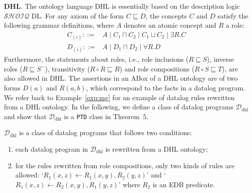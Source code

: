 \documentclass{article}
\begin{document}
\textbf{DHL}. The ontology language DHL \cite{DBLP:conf/www/GrosofHVD03} is essentially based on the description logic $\mathcal{SHOIQ}$
DL. 
For any axiom of the form $C\sqsubseteq D$, the concepts $C$ and $D$ satisfy the following grammar definitions, where $A$ denotes an atomic concept and $R$ a role:
%
  \begin{align*}
    C_{(i)} ::= & A \mid C_1 \sqcap C_2 \mid C_1 \sqcup C_2 \mid \exists R.C\\
    D_{(i)} ::= & A \mid D_1 \sqcap D_2 \mid \forall R.D
  \end{align*}
%
Furthermore, the statements about roles, i.e., role inclusions ($R\sqsubseteq S$), inverse roles ($R\sqsubseteq S^-$), transitivity ($R\circ R\sqsubseteq R$) and role compositions ($R\circ S\sqsubseteq T$), are also allowed in DHL.
The assertions in
an ABox of a DHL ontology are of two forms $D(a)$ and $R(a,b)$, which correspond to the facts
in a datalog program. We refer back to Example~\ref{exp:mg} for an example of datalog rules rewritten from a DHL ontology.
In the following, we define a class of datalog programs $\mathcal{D}_{\text{dhl}}$ and
show that $\mathcal{D}_{\text{dhl}}$ is a \texttt{PTD} class in Theorem~5.

\begin{definition}\label{def:ddhl} $\mathcal{D}_{\text{dhl}}$ is a class of datalog programs that follows two conditions:
\begin{enumerate}
\item each datalog program in $\mathcal{D}_{\text{dhl}}$ is rewritten from a DHL ontology;
\item for the rules rewritten from role compositions, only two kinds of rules are allowed: `$R_1(x,z)\leftarrow R_1(x,y),R_2(y,z)$' and `$R_1(x,z)\leftarrow R_2(x,y),R_1(y,z)$'
where $R_2$ is an EDB predicate.
\end{enumerate}

\end{definition}
\end{document}

